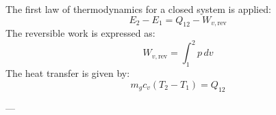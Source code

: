 The first law of thermodynamics for a closed system is applied:  
\[
E_2 - E_1 = Q_{12} - W_{v,\text{rev}}
\]  
The reversible work is expressed as:  
\[
W_{v,\text{rev}} = \int_{1}^{2} p \, dv
\]  
The heat transfer is given by:  
\[
m_g c_v (T_2 - T_1) = Q_{12}
\]  

---